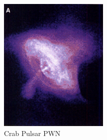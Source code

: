 \documentclass[12pt]{article}
\begin{document}
\begin{figure}[H]
    \centering
    \begin{subfigure}[b]{.49\textwidth}
        \centering
        \includegraphics[width=\linewidth]{crab pwn.png}
        \caption{Crab Pulsar PWN}
        \label{fig:2a}
    \end{subfigure}
    \hfill
    \begin{subfigure}[b]{.485\textwidth}
        \centering

\end{subfigure}
\end{figure}
\end{document}
